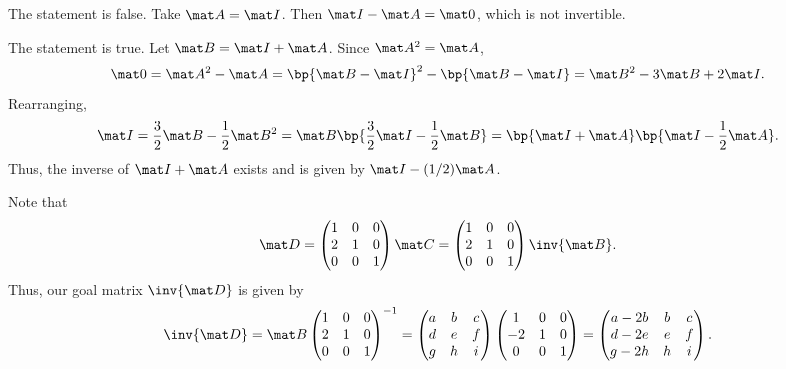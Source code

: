 \begin{solution}
\begin{ppart}
        \begin{psubpart}
            The statement is false. Take $\mat A = \mat I$. Then $\mat I - \mat A = \mat 0$, which is not invertible.
        \end{psubpart}
        \begin{psubpart}
            The statement is true. Let $\mat B = \mat I + \mat A$. Since $\mat A^2 = \mat A$, \[\mat 0 = \mat A^2 - \mat A = \bp{\mat B - \mat I}^2 - \bp{\mat B - \mat I} = \mat B^2 - 3\mat B + 2 \mat I.\] Rearranging, \[\mat I = \frac32 \mat B - \frac12 \mat B^2 = \mat B \bp{\frac32 \mat I - \frac12 \mat B} = \bp{\mat I + \mat A} \bp{\mat I - \frac12 \mat A}.\] Thus, the inverse of $\mat I + \mat A$ exists and is given by $\mat I - (1/2) \mat A$.
        \end{psubpart}
    \end{ppart}
    \begin{ppart}
        Note that \[\mat D = \begin{pmatrix}1 & 0 & 0 \\ 2 & 1 & 0 \\ 0 & 0 & 1\end{pmatrix} \mat C = \begin{pmatrix}1 & 0 & 0 \\ 2 & 1 & 0 \\ 0 & 0 & 1\end{pmatrix} \inv{\mat B}.\] Thus, our goal matrix $\inv{\mat D}$ is given by \[\inv{\mat D} = \mat B \begin{pmatrix}1 & 0 & 0 \\ 2 & 1 & 0 \\ 0 & 0 & 1\end{pmatrix}^{-1} = \begin{pmatrix} a & b & c \\ d & e & f \\ g & h & i \end{pmatrix}\begin{pmatrix}1 & 0 & 0 \\ -2 & 1 & 0 \\ 0 & 0 & 1\end{pmatrix} = \begin{pmatrix}a-2b & b & c \\ d-2e & e & f \\ g-2h & h & i\end{pmatrix}.\]
    \end{ppart}
\end{solution}